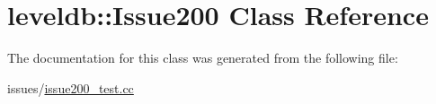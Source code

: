 \hypertarget{classleveldb_1_1_issue200}{\section{leveldb\-:\-:Issue200 Class Reference}
\label{classleveldb_1_1_issue200}
}


The documentation for this class was generated from the following file\-:\begin{DoxyCompactItemize}
\item 
issues/\hyperlink{issue200__test_8cc}{issue200\-\_\-test.\-cc}\end{DoxyCompactItemize}
